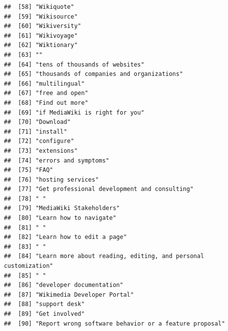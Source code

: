 \documentclass[
]{article}
\begin{document}
\begin{verbatim}
##  [58] "Wikiquote"                                                          
##  [59] "Wikisource"                                                         
##  [60] "Wikiversity"                                                        
##  [61] "Wikivoyage"                                                         
##  [62] "Wiktionary"                                                         
##  [63] ""                                                                   
##  [64] "tens of thousands of websites"                                      
##  [65] "thousands of companies and organizations"                           
##  [66] "multilingual"                                                       
##  [67] "free and open"                                                      
##  [68] "Find out more"                                                      
##  [69] "if MediaWiki is right for you"                                      
##  [70] "Download"                                                           
##  [71] "install"                                                            
##  [72] "configure"                                                          
##  [73] "extensions"                                                         
##  [74] "errors and symptoms"                                                
##  [75] "FAQ"                                                                
##  [76] "hosting services"                                                   
##  [77] "Get professional development and consulting"                        
##  [78] " "                                                                  
##  [79] "MediaWiki Stakeholders"                                             
##  [80] "Learn how to navigate"                                              
##  [81] " "                                                                  
##  [82] "Learn how to edit a page"                                           
##  [83] " "                                                                  
##  [84] "Learn more about reading, editing, and personal customization"      
##  [85] " "                                                                  
##  [86] "developer documentation"                                            
##  [87] "Wikimedia Developer Portal"                                         
##  [88] "support desk"                                                       
##  [89] "Get involved"                                                       
##  [90] "Report wrong software behavior or a feature proposal"               

\end{verbatim}
\end{document}
